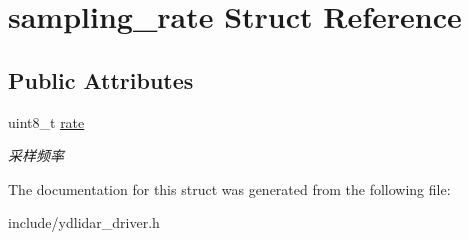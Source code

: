 \hypertarget{structsampling__rate}{}\section{sampling\+\_\+rate Struct Reference}
\label{structsampling__rate}
\subsection*{Public Attributes}
\begin{DoxyCompactItemize}
\item 
uint8\+\_\+t \hyperlink{structsampling__rate_a8d860fbedd930d2022fe7bb6cf1f78b6}{rate}\hypertarget{structsampling__rate_a8d860fbedd930d2022fe7bb6cf1f78b6}{}\label{structsampling__rate_a8d860fbedd930d2022fe7bb6cf1f78b6}

\begin{DoxyCompactList}\small\item\em 采样频率 \end{DoxyCompactList}\end{DoxyCompactItemize}


The documentation for this struct was generated from the following file\+:\begin{DoxyCompactItemize}
\item 
include/ydlidar\+\_\+driver.\+h\end{DoxyCompactItemize}
